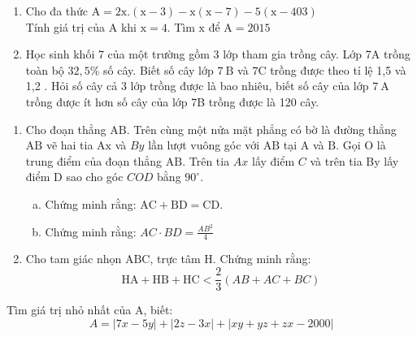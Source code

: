 \begin{bt}
	\hfill
	\begin{enumerate}[1.]
		\item Cho đa thức $\mathrm{A}=2 \mathrm{x} .(\mathrm{x}-3)-\mathrm{x}(\mathrm{x}-7)-5(\mathrm{x}-403)$
		\\Tính giá trị của $\mathrm{A}$ khi $\mathrm{x}=4$. Tìm $\mathrm{x}$ để $\mathrm{A}=2015$
		\item Học sinh khối 7 của một trường gồm 3 lớp tham gia trồng cây. Lớp 7A trồng toàn bộ $32,5 \%$ số cây. Biết số cây lớp $7 \mathrm{~B}$ và $7 \mathrm{C}$ trồng được theo tỉ lệ 1,5 và 1,2 . Hỏi số cây cả 3 lớp trồng được là bao nhiêu, biết số cây của lớp $7 \mathrm{~A}$ trồng được ít hơn số cây của lớp 7B trồng được là 120 cây.
	\end{enumerate}
	\loigiai{} 
\end{bt}


\begin{bt}
	\hfill
	\begin{enumerate}[1.]
		\item Cho đoạn thẳng $\mathrm{AB}$. Trên cùng một nửa mặt phẳng có bờ là đường thẳng $\mathrm{AB}$ vẽ hai tia $\mathrm{Ax}$ và $B y$ lần lượt vuông góc với $\mathrm{AB}$ tại $\mathrm{A}$ và $\mathrm{B}$. Gọi $\mathrm{O}$ là trung điểm của đoạn thẳng $\mathrm{AB}$. Trên tia $A x$ lấy điểm $C$ và trên tia By lấy điểm $\mathrm{D}$ sao cho góc $C O D$ bằng $90^{\circ}$.
		\begin{enumerate}[a.]
			\item Chứng minh rằng: $\mathrm{AC}+\mathrm{BD}=\mathrm{CD}$.
			\item Chứng minh rằng: $A C \cdot B D=\frac{A B^2}{4}$
		\end{enumerate}
		\item Cho tam giác nhọn $\mathrm{ABC}$, trực tâm $\mathrm{H}$. Chứng minh rằng:
		$$
		\mathrm{HA}+\mathrm{HB}+\mathrm{HC}<\frac{2}{3}(A B+A C+B C)
		$$
	\end{enumerate}
	\loigiai{}
\end{bt}

\begin{bt}
	Tìm giá trị nhỏ nhất của $\mathrm{A}$, biết:
	$$
	A=|7 x-5 y|+|2 z-3 x|+|x y+y z+z x-2000|
	$$
	\loigiai{} 
\end{bt}


